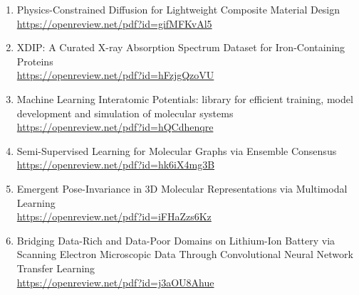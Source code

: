 \begin{enumerate}
  \item Physics-Constrained Diffusion for Lightweight Composite Material Design\\
        \url{https://openreview.net/pdf?id=gifMFKvAl5}
  \item XDIP: A Curated X-ray Absorption Spectrum Dataset for Iron-Containing Proteins\\
        \url{https://openreview.net/pdf?id=hFzjgQzoVU}
  \item Machine Learning Interatomic Potentials: library for efficient training, model development and simulation of molecular systems\\
        \url{https://openreview.net/pdf?id=hQCdhenqre}
  \item Semi-Supervised Learning for Molecular Graphs via Ensemble Consensus\\
        \url{https://openreview.net/pdf?id=hk6iX4mg3B}
  \item Emergent Pose-Invariance in 3D Molecular Representations via Multimodal Learning\\
        \url{https://openreview.net/pdf?id=iFHaZzs6Kz}
  \item Bridging Data-Rich and Data-Poor Domains on Lithium-Ion Battery via Scanning Electron Microscopic Data Through Convolutional Neural Network Transfer Learning\\
        \url{https://openreview.net/pdf?id=j3aOU8Ahue}
\end{enumerate}

